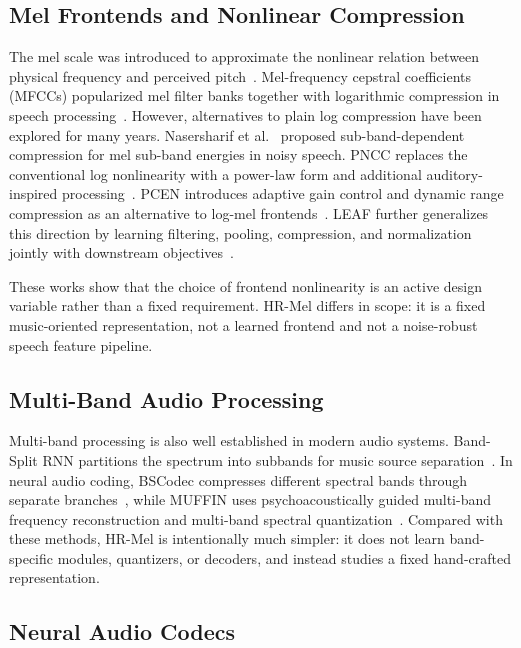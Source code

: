 \documentclass[twocolumn]{article}
\begin{document}
\subsection{Mel Frontends and Nonlinear Compression}

The mel scale was introduced to approximate the nonlinear relation between physical frequency and perceived pitch~\cite{stevens1937scale}. Mel-frequency cepstral coefficients (MFCCs) popularized mel filter banks together with logarithmic compression in speech processing~\cite{davis1980comparison}. However, alternatives to plain log compression have been explored for many years. Nasersharif et al.~\cite{nasersharif2007mel} proposed sub-band-dependent compression for mel sub-band energies in noisy speech. PNCC replaces the conventional log nonlinearity with a power-law form and additional auditory-inspired processing~\cite{pncc2016}. PCEN introduces adaptive gain control and dynamic range compression as an alternative to log-mel frontends~\cite{pcen2018}. LEAF further generalizes this direction by learning filtering, pooling, compression, and normalization jointly with downstream objectives~\cite{leaf2021}.

These works show that the choice of frontend nonlinearity is an active design variable rather than a fixed requirement. HR-Mel differs in scope: it is a fixed music-oriented representation, not a learned frontend and not a noise-robust speech feature pipeline.

\subsection{Multi-Band Audio Processing}

Multi-band processing is also well established in modern audio systems. Band-Split RNN partitions the spectrum into subbands for music source separation~\cite{luo2023bandsplit}. In neural audio coding, BSCodec compresses different spectral bands through separate branches~\cite{bscodec2025}, while MUFFIN uses psychoacoustically guided multi-band frequency reconstruction and multi-band spectral quantization~\cite{muffin2025}. Compared with these methods, HR-Mel is intentionally much simpler: it does not learn band-specific modules, quantizers, or decoders, and instead studies a fixed hand-crafted representation.

\subsection{Neural Audio Codecs}
\end{document}
